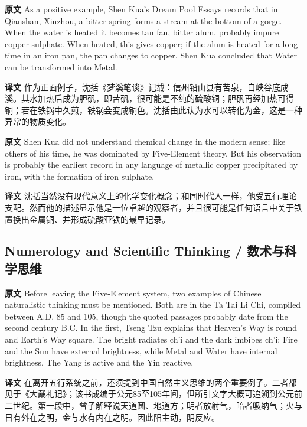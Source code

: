 \documentclass[UTF8,zihao=-4]{ctexart}
\newcommand{\BodyFont}{\fontsize{10.5pt}{15.5pt}\selectfont}
\newcommand{\origlabel}{\textbf{原文}\quad}
\newcommand{\translabel}{\textbf{译文}\quad}
\newenvironment{enblock}{\par\noindent\begingroup\BodyFont\origlabel}{\par\endgroup}
\newenvironment{zhblock}{\par\noindent\begingroup\BodyFont\translabel}{\par\endgroup\vspace{0.35em}}
\begin{document}
\begin{enblock}
As a positive example, Shen Kua's Dream Pool Essays records that in Qianshan, Xinzhou, a bitter spring forms a stream at the bottom of a gorge. When the water is heated it becomes tan fan, bitter alum, probably impure copper sulphate. When heated, this gives copper; if the alum is heated for a long time in an iron pan, the pan changes to copper. Shen Kua concluded that Water can be transformed into Metal.
\end{enblock}
\begin{zhblock}
作为正面例子，沈括《梦溪笔谈》记载：信州铅山县有苦泉，自峡谷底成溪。其水加热后成为胆矾，即苦矾，很可能是不纯的硫酸铜；胆矾再经加热可得铜；若在铁锅中久煎，铁锅会变成铜色。沈括由此认为水可以转化为金，这是一种异常的物质变化。
\end{zhblock}

\begin{enblock}
Shen Kua did not understand chemical change in the modern sense; like others of his time, he was dominated by Five-Element theory. But his observation is probably the earliest record in any language of metallic copper precipitated by iron, with the formation of iron sulphate.
\end{enblock}
\begin{zhblock}
沈括当然没有现代意义上的化学变化概念；和同时代人一样，他受五行理论支配。然而他的描述显示他是一位卓越的观察者，并且很可能是任何语言中关于铁置换出金属铜、并形成硫酸亚铁的最早记录。
\end{zhblock}

\subsection*{Numerology and Scientific Thinking / 数术与科学思维}

\begin{enblock}
Before leaving the Five-Element system, two examples of Chinese naturalistic thinking must be mentioned. Both are in the Ta Tai Li Chi, compiled between A.D. 85 and 105, though the quoted passages probably date from the second century B.C. In the first, Tseng Tzu explains that Heaven's Way is round and Earth's Way square. The bright radiates ch'i and the dark imbibes ch'i; Fire and the Sun have external brightness, while Metal and Water have internal brightness. The Yang is active and the Yin reactive.
\end{enblock}
\begin{zhblock}
在离开五行系统之前，还须提到中国自然主义思维的两个重要例子。二者都见于《大戴礼记》；该书成编于公元85至105年间，但所引文字大概可追溯到公元前二世纪。第一段中，曾子解释说天道圆、地道方；明者放射气，暗者吸纳气；火与日有外在之明，金与水有内在之明。因此阳主动，阴反应。
\end{zhblock}
\end{document}

